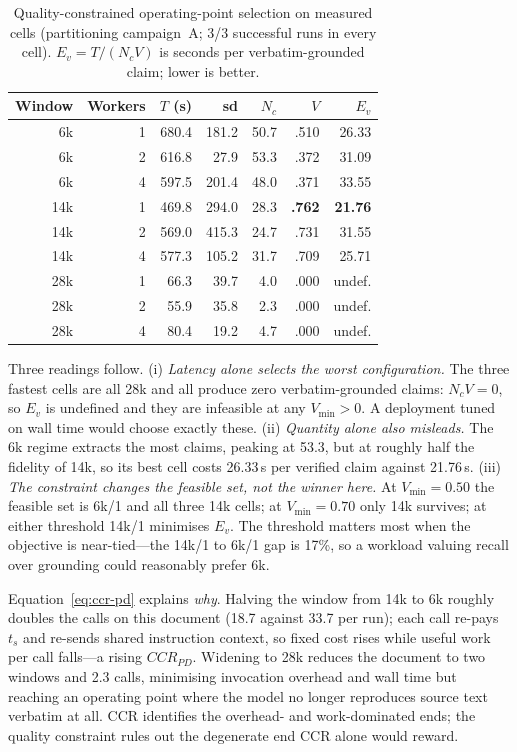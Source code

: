 \documentclass[conference]{IEEEtran}
\begin{document}
\begin{table}[t]
\caption{Quality-constrained operating-point selection on measured cells (partitioning campaign~A; 3/3 successful runs in every cell). $E_v=T/(N_cV)$ is seconds per verbatim-grounded claim; lower is better.}
\label{tab:ev}
\centering\scriptsize
\begin{tabular}{rrrrrrr}
\toprule
Window & Workers & $T$ (s) & sd & $N_c$ & $V$ & $E_v$\\
\midrule
6k  & 1 & 680.4 & 181.2 & 50.7 & .510 & 26.33\\
6k  & 2 & 616.8 &  27.9 & 53.3 & .372 & 31.09\\
6k  & 4 & 597.5 & 201.4 & 48.0 & .371 & 33.55\\
14k & 1 & 469.8 & 294.0 & 28.3 & \textbf{.762} & \textbf{21.76}\\
14k & 2 & 569.0 & 415.3 & 24.7 & .731 & 31.55\\
14k & 4 & 577.3 & 105.2 & 31.7 & .709 & 25.71\\
28k & 1 &  66.3 &  39.7 &  4.0 & .000 & undef.\\
28k & 2 &  55.9 &  35.8 &  2.3 & .000 & undef.\\
28k & 4 &  80.4 &  19.2 &  4.7 & .000 & undef.\\
\bottomrule
\end{tabular}
\end{table}

Three readings follow. (i) \emph{Latency alone selects the worst configuration.} The three fastest cells are all 28k and all produce zero verbatim-grounded claims: $N_cV=0$, so $E_v$ is undefined and they are infeasible at any $V_{\min}>0$. A deployment tuned on wall time would choose exactly these. (ii) \emph{Quantity alone also misleads.} The 6k regime extracts the most claims, peaking at 53.3, but at roughly half the fidelity of 14k, so its best cell costs 26.33\,s per verified claim against 21.76\,s. (iii) \emph{The constraint changes the feasible set, not the winner here.} At $V_{\min}=0.50$ the feasible set is 6k/1 and all three 14k cells; at $V_{\min}=0.70$ only 14k survives; at either threshold 14k/1 minimises $E_v$. The threshold matters most when the objective is near-tied---the 14k/1 to 6k/1 gap is 17\%, so a workload valuing recall over grounding could reasonably prefer 6k.

Equation~\ref{eq:ccr-pd} explains \emph{why}. Halving the window from 14k to 6k roughly doubles the calls on this document (18.7 against 33.7 per run); each call re-pays $t_s$ and re-sends shared instruction context, so fixed cost rises while useful work per call falls---a rising $CCR_{PD}$. Widening to 28k reduces the document to two windows and 2.3 calls, minimising invocation overhead and wall time but reaching an operating point where the model no longer reproduces source text verbatim at all. CCR identifies the overhead- and work-dominated ends; the quality constraint rules out the degenerate end CCR alone would reward.
\end{document}
